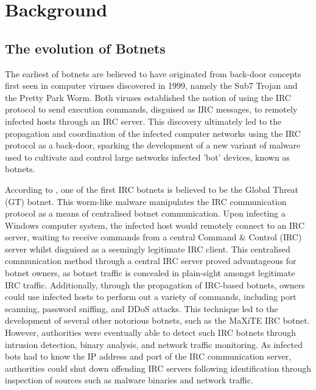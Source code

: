 
\chapter{Background}

\section{The evolution of Botnets}

The earliest of botnets are believed to have originated from back-door concepts first seen in computer viruses discovered in 1999, namely the Sub7 Trojan and the Pretty Park Worm. Both viruses established the notion of using the IRC protocol to send execution commands, disguised as IRC messages, to remotely infected hosts through an IRC server. This discovery ultimately led to the propagation and coordination of the infected computer networks using the IRC protocol as a back-door, sparking the development of a new variant of malware used to cultivate and control large networks infected 'bot' devices, known as botnets. \citep{Ferguson2010}

According to \citet{Schiller2007}, one of the first IRC botnets is believed to be the Global Threat (GT) botnet. This worm-like malware manipulates the IRC communication protocol as a means of centralised botnet communication. Upon infecting a Windows computer system, the infected host would remotely connect to an IRC server, waiting to receive commands from a central Command \& Control (IRC) server whilst disguised as a seemingly legitimate IRC client. This centralised communication method through a central IRC server proved advantageous for botnet owners, as botnet traffic is concealed in plain-sight amongst legitimate IRC traffic. Additionally, through the propagation of IRC-based botnets, owners could use infected hosts to perform out a variety of commands, including port scanning, password sniffing, and DDoS attacks. This technique led to the development of several other notorious botnets, such as the MaXiTE IRC botnet. However, authorities were eventually able to detect such IRC botnets through intrusion detection, binary analysis, and network traffic monitoring. As infected bots had to know the IP address and port of the IRC communication server, authorities could shut down offending IRC servers following identification through inspection of sources such as malware binaries and network traffic.


